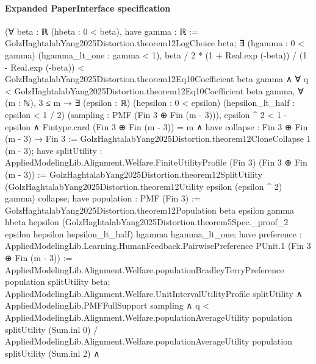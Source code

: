 \documentclass[10pt]{article}
\begin{document}
\paragraph{Expanded PaperInterface specification}
\begin{ReviewVerbatim}
(∀ {beta : ℝ} (hbeta : 0 < beta),
    have gamma : ℝ := GolzHaghtalabYang2025Distortion.theorem12LogChoice beta;
    ∃ (hgamma : 0 < gamma) (hgamma_lt_one : gamma < 1),
      beta / 2 * (1 + Real.exp (-beta)) / (1 - Real.exp (-beta)) <
          GolzHaghtalabYang2025Distortion.theorem12Eq10Coefficient beta gamma ∧
        ∀ q < GolzHaghtalabYang2025Distortion.theorem12Eq10Coefficient beta gamma,
          ∀ (m : ℕ),
            3 ≤ m →
              ∃ (epsilon : ℝ) (hepsilon : 0 < epsilon) (hepsilon_lt_half : epsilon < 1 / 2) (sampling :
                PMF (Fin 3 ⊕ Fin (m - 3))),
                epsilon ^ 2 < 1 - epsilon ∧
                  Fintype.card (Fin 3 ⊕ Fin (m - 3)) = m ∧
                    have collapse : Fin 3 ⊕ Fin (m - 3) → Fin 3 :=
                      GolzHaghtalabYang2025Distortion.theorem12CloneCollapse 1 (m - 3);
                    have splitUtility :
                      AppliedModelingLib.Alignment.Welfare.FiniteUtilityProfile (Fin 3) (Fin 3 ⊕ Fin (m - 3)) :=
                      GolzHaghtalabYang2025Distortion.theorem12SplitUtility
                        (GolzHaghtalabYang2025Distortion.theorem12Utility epsilon (epsilon ^ 2) gamma) collapse;
                    have population : PMF (Fin 3) :=
                      GolzHaghtalabYang2025Distortion.theorem12Population beta epsilon gamma hbeta hepsilon
                        (GolzHaghtalabYang2025Distortion.theorem5Spec._proof_2 epsilon hepsilon hepsilon_lt_half) hgamma
                        hgamma_lt_one;
                    have preference :
                      AppliedModelingLib.Learning.HumanFeedback.PairwisePreference PUnit.{1} (Fin 3 ⊕ Fin (m - 3)) :=
                      AppliedModelingLib.Alignment.Welfare.populationBradleyTerryPreference population splitUtility
                        beta;
                    AppliedModelingLib.Alignment.Welfare.UnitIntervalUtilityProfile splitUtility ∧
                      AppliedModelingLib.PMFFullSupport sampling ∧
                        q <
                            AppliedModelingLib.Alignment.Welfare.populationAverageUtility population splitUtility
                                (Sum.inl 0) /
                              AppliedModelingLib.Alignment.Welfare.populationAverageUtility population splitUtility
                                (Sum.inl 2) ∧

\end{ReviewVerbatim}
\end{document}
